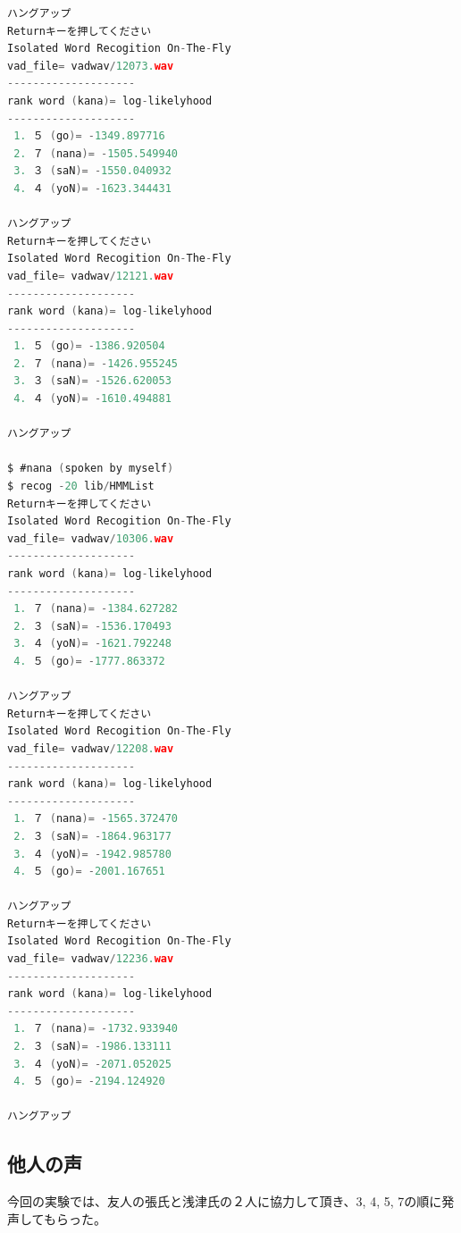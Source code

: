 \documentclass[11pt,a4paper, uplatex]{jsarticle}
\begin{document}
\begin{lstlisting}[language=c, caption=\texttt{recog}実行結果]
ハングアップ
Returnキーを押してください
Isolated Word Recogition On-The-Fly
vad_file= vadwav/12073.wav
--------------------
rank word (kana)= log-likelyhood
--------------------
 1. ５ (go)= -1349.897716
 2. ７ (nana)= -1505.549940
 3. ３ (saN)= -1550.040932
 4. ４ (yoN)= -1623.344431

ハングアップ
Returnキーを押してください
Isolated Word Recogition On-The-Fly
vad_file= vadwav/12121.wav
--------------------
rank word (kana)= log-likelyhood
--------------------
 1. ５ (go)= -1386.920504
 2. ７ (nana)= -1426.955245
 3. ３ (saN)= -1526.620053
 4. ４ (yoN)= -1610.494881

ハングアップ

$ #nana (spoken by myself)
$ recog -20 lib/HMMList
Returnキーを押してください
Isolated Word Recogition On-The-Fly
vad_file= vadwav/10306.wav
--------------------
rank word (kana)= log-likelyhood
--------------------
 1. ７ (nana)= -1384.627282
 2. ３ (saN)= -1536.170493
 3. ４ (yoN)= -1621.792248
 4. ５ (go)= -1777.863372

ハングアップ
Returnキーを押してください
Isolated Word Recogition On-The-Fly
vad_file= vadwav/12208.wav
--------------------
rank word (kana)= log-likelyhood
--------------------
 1. ７ (nana)= -1565.372470
 2. ３ (saN)= -1864.963177
 3. ４ (yoN)= -1942.985780
 4. ５ (go)= -2001.167651

ハングアップ
Returnキーを押してください
Isolated Word Recogition On-The-Fly
vad_file= vadwav/12236.wav
--------------------
rank word (kana)= log-likelyhood
--------------------
 1. ７ (nana)= -1732.933940
 2. ３ (saN)= -1986.133111
 3. ４ (yoN)= -2071.052025
 4. ５ (go)= -2194.124920

ハングアップ
\end{lstlisting}

\subsection{他人の声}
今回の実験では、友人の張氏と浅津氏の２人に協力して頂き、3, 4, 5, 7の順に発声してもらった。
\end{document}
